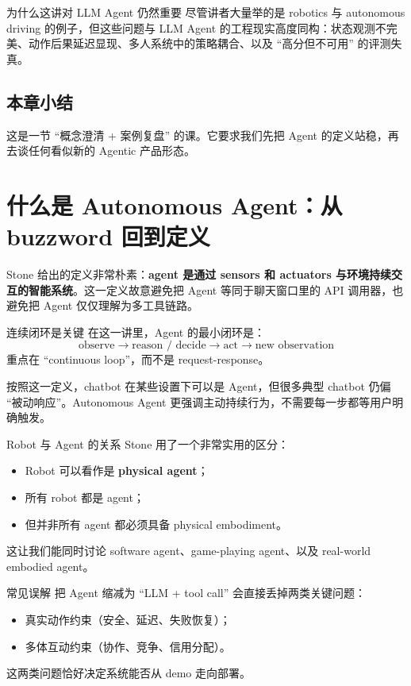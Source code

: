 \documentclass[a4paper]{article}
\begin{document}
\begin{knowledgebox}{为什么这讲对 LLM Agent 仍然重要}
尽管讲者大量举的是 robotics 与 autonomous driving 的例子，但这些问题与 LLM Agent 的工程现实高度同构：状态观测不完美、动作后果延迟显现、多人系统中的策略耦合、以及 ``高分但不可用'' 的评测失真。
\end{knowledgebox}

\subsection{本章小结}
这是一节 ``概念澄清 + 案例复盘'' 的课。它要求我们先把 Agent 的定义站稳，再去谈任何看似新的 Agentic 产品形态。

\section{什么是 Autonomous Agent：从 buzzword 回到定义}

Stone 给出的定义非常朴素：\textbf{agent 是通过 sensors 和 actuators 与环境持续交互的智能系统}。这一定义故意避免把 Agent 等同于聊天窗口里的 API 调用器，也避免把 Agent 仅仅理解为多工具链路。

\begin{knowledgebox}{连续闭环是关键}
在这一讲里，Agent 的最小闭环是：
\[
\text{observe} \rightarrow \text{reason / decide} \rightarrow \text{act} \rightarrow \text{new observation}
\]
重点在 ``continuous loop''，而不是 request-response。
\end{knowledgebox}

按照这一定义，chatbot 在某些设置下可以是 Agent，但很多典型 chatbot 仍偏 ``被动响应''。Autonomous Agent 更强调主动持续行为，不需要每一步都等用户明确触发。

\begin{importantbox}{Robot 与 Agent 的关系}
Stone 用了一个非常实用的区分：
\begin{itemize}
    \item Robot 可以看作是 \textbf{physical agent}；
    \item 所有 robot 都是 agent；
    \item 但并非所有 agent 都必须具备 physical embodiment。
\end{itemize}
这让我们能同时讨论 software agent、game-playing agent、以及 real-world embodied agent。
\end{importantbox}

\begin{warningbox}{常见误解}
把 Agent 缩减为 ``LLM + tool call'' 会直接丢掉两类关键问题：
\begin{itemize}
    \item 真实动作约束（安全、延迟、失败恢复）；
    \item 多体互动约束（协作、竞争、信用分配）。
\end{itemize}
这两类问题恰好决定系统能否从 demo 走向部署。
\end{warningbox}
\end{document}
